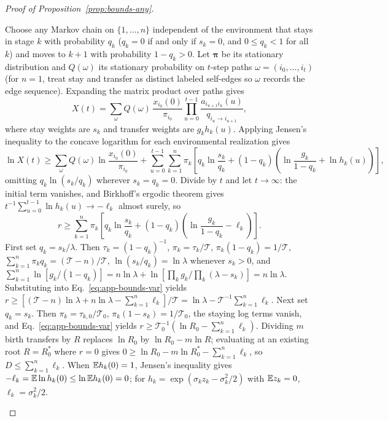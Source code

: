 \begin{proof}[Proof of Proposition~{\upshape\ref{prop:bounds-any}}]
\begin{enumerate}
Choose any Markov chain on $\{1, \dots, n\}$ independent of the environment that stays in stage $k$ with probability $q_k$ ($q_k = 0$ if and only if $s_k = 0$, and $0 \le q_k < 1$ for all $k$) and moves to $k + 1$ with probability $1 - q_k > 0$. Let $\boldsymbol{\pi}$ be its stationary distribution and $Q(\omega)$ its stationary probability on $t$-step paths $\omega = (i_0, \dots, i_t)$ (for $n = 1$, treat stay and transfer as distinct labeled self-edges so $\omega$ records the edge sequence). Expanding the matrix product over paths gives
\[
X(t) = \sum_\omega Q(\omega)\,\frac{x_{i_0}(0)}{\pi_{i_0}} \prod_{u=0}^{t-1} \frac{a_{i_{u+1}i_u}(u)}{q_{i_u \to i_{u+1}}},
\]
where stay weights are $s_k$ and transfer weights are $g_k h_k(u)$. Applying Jensen's inequality to the concave logarithm for each environmental realization gives
\[
\ln X(t) \ge \sum_\omega Q(\omega)\ln\frac{x_{i_0}(0)}{\pi_{i_0}} + \sum_{u=0}^{t-1}\sum_{k=1}^n \pi_k \left[ q_k\ln\frac{s_k}{q_k} + (1 - q_k)\left(\ln\frac{g_k}{1 - q_k} + \ln h_k(u)\right) \right],
\]
omitting $q_k\ln(s_k/q_k)$ wherever $s_k = q_k = 0$. Divide by $t$ and let $t \to \infty$: the initial term vanishes, and Birkhoff's ergodic theorem gives $t^{-1}\sum_{u=0}^{t-1} \ln h_k(u) \to -\ell_k$ almost surely, so
\begin{equation}
r \ge \sum_{k=1}^n \pi_k \left[ q_k\ln\frac{s_k}{q_k} + (1 - q_k)\left(\ln\frac{g_k}{1 - q_k} - \ell_k\right) \right].
\label{eq:app-bounds-var}
\end{equation}
First set $q_k = s_k/\lambda$. Then $\tau_k = (1 - q_k)^{-1}$, $\pi_k = \tau_k/\mathcal{T}$, $\pi_k(1 - q_k) = 1/\mathcal{T}$, $\sum_{k=1}^n \pi_k q_k = (\mathcal{T} - n)/\mathcal{T}$, $\ln(s_k/q_k) = \ln\lambda$ whenever $s_k > 0$, and $\sum_{k=1}^n \ln[g_k/(1 - q_k)] = n\ln\lambda + \ln[\prod_k g_k / \prod_k (\lambda - s_k)] = n\ln\lambda$. Substituting into Eq.~\eqref{eq:app-bounds-var} yields $r \ge [(\mathcal{T} - n)\ln\lambda + n\ln\lambda - \sum_{k=1}^n \ell_k]/\mathcal{T} = \ln\lambda - \mathcal{T}^{-1}\sum_{k=1}^n \ell_k$. Next set $q_k = s_k$. Then $\pi_k = \tau_{k,0}/\mathcal{T}_0$, $\pi_k(1 - s_k) = 1/\mathcal{T}_0$, the staying log terms vanish, and Eq.~\eqref{eq:app-bounds-var} yields $r \ge \mathcal{T}_0^{-1}(\ln R_0 - \sum_{k=1}^n \ell_k)$. Dividing $m$ birth transfers by $R$ replaces $\ln R_0$ by $\ln R_0 - m\ln R$; evaluating at an existing root $R = R_0^*$ where $r = 0$ gives $0 \ge \ln R_0 - m\ln R_0^* - \sum_{k=1}^n \ell_k$, so $D \le \sum_{k=1}^n \ell_k$. When $\mathbb{E} h_k(0) = 1$, Jensen's inequality gives $-\ell_k = \mathbb{E}\ln h_k(0) \le \ln\mathbb{E} h_k(0) = 0$; for $h_k = \exp(\sigma_k z_k - \sigma_k^2/2)$ with $\mathbb{E} z_k = 0$, $\ell_k = \sigma_k^2/2$.

\end{enumerate}
\end{proof}
